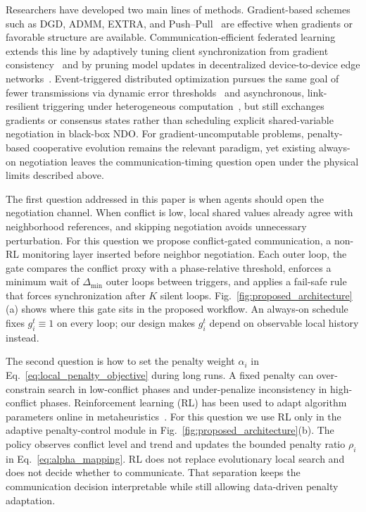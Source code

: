 \documentclass[conference]{IEEEtran}
\begin{document}
Researchers have developed two main lines of methods. Gradient-based schemes such as DGD, ADMM, EXTRA, and Push--Pull~\cite{ref_nedic_subgrad,ref_boyd_admm,ref_shi_extra,ref_pu_pushpull_2021} are effective when gradients or favorable structure are available. Communication-efficient federated learning extends this line by adaptively tuning client synchronization from gradient consistency~\cite{ref_gift_fl_2023} and by pruning model updates in decentralized device-to-device edge networks~\cite{ref_dfl_prune_tnse_2025}. Event-triggered distributed optimization pursues the same goal of fewer transmissions via dynamic error thresholds~\cite{ref_et_nonconvex_tac_2023} and asynchronous, link-resilient triggering under heterogeneous computation~\cite{ref_daaet_tac_2024}, but still exchanges gradients or consensus states rather than scheduling explicit shared-variable negotiation in black-box NDO. For gradient-uncomputable problems, penalty-based cooperative evolution remains the relevant paradigm, yet existing always-on negotiation leaves the communication-timing question open under the physical limits described above.

The first question addressed in this paper is when agents should open the negotiation channel. When conflict is low, local shared values already agree with neighborhood references, and skipping negotiation avoids unnecessary perturbation. For this question we propose conflict-gated communication, a non-RL monitoring layer inserted before neighbor negotiation. Each outer loop, the gate compares the conflict proxy with a phase-relative threshold, enforces a minimum wait of $\Delta_{\min}$ outer loops between triggers, and applies a fail-safe rule that forces synchronization after $K$ silent loops. Fig.~\ref{fig:proposed_architecture}(a) shows where this gate sits in the proposed workflow. An always-on schedule fixes $g_i^t\equiv 1$ on every loop; our design makes $g_i^t$ depend on observable local history instead.

The second question is how to set the penalty weight $\alpha_i$ in Eq.~\eqref{eq:local_penalty_objective} during long runs. A fixed penalty can over-constrain search in low-conflict phases and under-penalize inconsistency in high-conflict phases. Reinforcement learning (RL) has been used to adapt algorithm parameters online in metaheuristics~\cite{ref_karafotias_param_control,ref_rl_ea_survey_2024,ref_rl_metaheuristic_2023,ref_sutton_barto}. For this question we use RL only in the adaptive penalty-control module in Fig.~\ref{fig:proposed_architecture}(b). The policy observes conflict level and trend and updates the bounded penalty ratio $\rho_i$ in Eq.~\eqref{eq:alpha_mapping}. RL does not replace evolutionary local search and does not decide whether to communicate. That separation keeps the communication decision interpretable while still allowing data-driven penalty adaptation.
\end{document}
